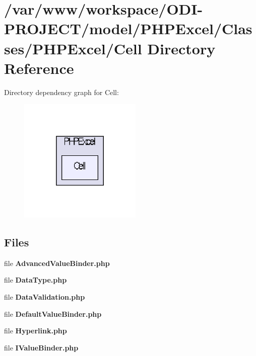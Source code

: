 \section{/var/www/workspace/\+O\+D\+I-\/\+P\+R\+O\+J\+E\+C\+T/model/\+P\+H\+P\+Excel/\+Classes/\+P\+H\+P\+Excel/\+Cell Directory Reference}
\label{dir_dbdb66517f1b2fe7a637e788647c3b2f}
Directory dependency graph for Cell\+:\nopagebreak
\begin{figure}[H]
\begin{center}
\leavevmode
\includegraphics[width=166pt]{dir_dbdb66517f1b2fe7a637e788647c3b2f_dep}
\end{center}
\end{figure}
\subsection*{Files}
\begin{DoxyCompactItemize}
\item 
file {\bfseries Advanced\+Value\+Binder.\+php}
\item 
file {\bfseries Data\+Type.\+php}
\item 
file {\bfseries Data\+Validation.\+php}
\item 
file {\bfseries Default\+Value\+Binder.\+php}
\item 
file {\bfseries Hyperlink.\+php}
\item 
file {\bfseries I\+Value\+Binder.\+php}
\end{DoxyCompactItemize}
